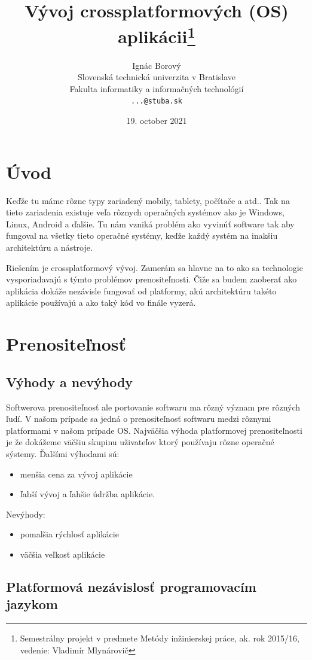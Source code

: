 \documentclass[10pt,twoside,slovak,a4paper]{article}
\title{Vývoj crossplatformových (OS) aplikácii\thanks{Semestrálny projekt v predmete Metódy inžinierskej práce, ak. rok 2015/16, vedenie: Vladimír Mlynárovič}}
\author{Ignác Borový\\[2pt]
	{\small Slovenská technická univerzita v Bratislave}\\
	{\small Fakulta informatiky a informačných technológií}\\
	{\small \texttt{...@stuba.sk}}
	}
\date{\small 19. october 2021}
\begin{document}
\maketitle


\section{Úvod} \label{Uvod}
\quad
Keďže tu máme rôzne typy zariadený mobily, tablety, počítače a atd.. Tak na tieto zariadenia existuje veľa rôznych operačných systémov ako je Windows, Linux, Android a ďalšie. Tu nám vzniká problém ako vyvinúť software tak aby fungoval na všetky tieto operačné systémy, keďže každý systém na inakšiu architektúru a nástroje. 

Riešením je crossplatformový vývoj. Zamerám sa hlavne na to ako sa technologie vysporiadavajú s týmto problémov prenositeľnosti. Čiže sa budem zaoberať ako aplikácia dokáže nezávisle fungovať od platformy, akú architektúru takéto aplikácie používajú a ako taký kód vo finále vyzerá.
\cite{Crossplatform}

\section{Prenositeľnosť}
\subsection{Výhody a nevýhody}

\quad
Softwerova prenositeľnosť ale portovanie softwaru ma rôzný význam pre rôzných ľudí. V našom prípade sa jedná o prenositeľnosť softwaru medzi rôznymi platformami v našom prípade OS. Najväčšia výhoda platformovej prenositeľnosti je že dokážeme väčšiu skupinu uživateľov ktorý používaju rôzne operačné sýstemy. 
Ďalšími výhodami sú:
\begin{itemize}
    \item menšia cena za vývoj aplikácie
    \item ľahší vývoj a ľahšie údržba aplikácie.
\end{itemize}
Nevýhody:
\begin{itemize}
    \item pomalšia rýchlosť aplikácie
    \item väčšia veľkosť aplikácie
\end{itemize}

\subsection{Platformová nezávislosť programovacím jazykom} \label{PlatformovaNezavislost}
\end{document}
